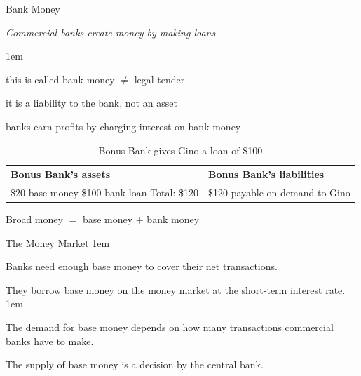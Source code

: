 \documentclass[11pt,aspectratio=43,usenames,dvipsnames]{beamer}
\let\olditemize=\itemize
\let\endolditemize=\enditemize
\renewenvironment{itemize}{\olditemize \itemsep1em}{\endolditemize}
\theoremstyle{definition}
\begin{document}
\begin{frame}{Bank Money}
\label{slide:Bank_Money}
    \begin{center}
        \textit{Commercial banks create money by making loans}
    \end{center}
    \begin{itemize}
        \item this is called bank money $ \neq $ legal tender
        \item it is a liability to the bank, not an asset
        \item banks earn profits by charging interest on bank money
    \end{itemize}
    \begin{table}
        \newlength\pp
        \setlength{}
        \begin{tabular}{p{\pp}|p{\pp}}
            Bonus Bank’s assets
                & Bonus Bank’s liabilities
            \\
            \hline
            \$20 base money
            \newline
            \$100 bank loan
            \newline
            Total: \$120
                & \$120 payable on
                \newline
                demand to Gino
            \\
        \end{tabular}
        \caption{Bonus Bank gives Gino a loan of \$100}
    \end{table}

    \begin{center}
        Broad money $ = $ base money $ + $ bank money
    \end{center}
\end{frame}

\begin{frame}{The Money Market}
\label{slide:The_Money_Market}
    \begin{itemize}
        \item Banks need enough base money to cover their net transactions.
        \item They borrow base money on the money market at the short-term interest rate.
        \begin{itemize}
            \item The demand for base money depends on how many transactions commercial banks have to make.
            \item The supply of base money is a decision by the central bank.
        \end{itemize}
    \end{itemize}
\end{frame}
\end{document}
